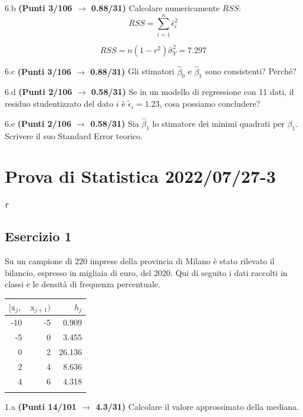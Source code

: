 \documentclass[
  11pt,
]{book}
\theoremstyle{mytheoremstyle}
\theoremstyle{mydefstyle}
\newenvironment{sol}
  {
  \begin{tcolorbox}[enhanced,breakable,arc=0.1mm,boxrule=1pt,colback=white,colframe=iblue,
  title=\bf \fontfamily{lmss}\selectfont \hspace{.5 cm} Soluzione,drop fuzzy shadow]

}{
\end{tcolorbox}
  }
\begin{document}
6.b \textbf{(Punti 3/106 \(\rightarrow\) 0.88/31)} Calcolare numericamente \(RSS\):
\[
RSS=\sum_{i=1}^n \hat\epsilon_i^2
\]

\begin{sol}
\[RSS=n(1-r^2)\hat\sigma_Y^2=7.297\]

\end{sol}

6.c \textbf{(Punti 3/106 \(\rightarrow\) 0.88/31)} Gli stimatori \(\hat\beta_0\) e \(\hat\beta_1\) sono consistenti?
Perché?

6.d \textbf{(Punti 2/106 \(\rightarrow\) 0.58/31)} Se in un modello di regressione con 11 dati,
il residuo studentizzato del dato \(i\) è \(\tilde \epsilon_i=1.23\), cosa possiamo concludere?

6.e \textbf{(Punti 2/106 \(\rightarrow\) 0.58/31)} Sia \(\hat\beta_1\) lo stimatore dei minimi quadrati per \(\beta_1\).
Scrivere il suo Standard Error teorico.

\section{Prova di Statistica 2022/07/27-3}\label{prova-di-statistica-20220727-3}

\texttt{r}

\subsection{Esercizio 1}\label{esercizio-1-18}

Su un campione di \(220\) imprese della provincia di Milano è stato
rilevato il bilancio, espresso in migliaia di euro, del 2020. Qui di seguito i dati raccolti in classi
e le densità di frequenza percentuale.

\begin{table}[H]
\centering
\begin{tabular}{rrr}
\toprule
$[\text{x}_j,$ & $\text{x}_{j+1})$ & $h_j$\\
\midrule
-10 & -5 & 0.909\\
-5 & 0 & 3.455\\
0 & 2 & 26.136\\
2 & 4 & 8.636\\
4 & 6 & 4.318\\
 &  & \\
\bottomrule
\end{tabular}
\end{table}

1.a \textbf{(Punti 14/101 \(\rightarrow\) 4.3/31)} Calcolare il valore approssimato della mediana.
\end{document}
